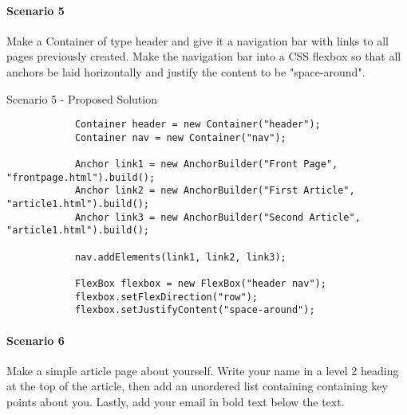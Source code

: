 \documentclass[12pt]{article}
\begin{document}
        \paragraph{Scenario 5}
        Make a Container of type header and give it a navigation bar with links to all pages previously created. Make the navigation bar into a CSS flexbox so that all anchors be laid horizontally and justify the content to be "space-around".
        
        \begin{shaded}
            Scenario 5 - Proposed Solution
            \begin{lstlisting}
            Container header = new Container("header");
            Container nav = new Container("nav");

            Anchor link1 = new AnchorBuilder("Front Page", "frontpage.html").build();
            Anchor link2 = new AnchorBuilder("First Article", "article1.html").build();
            Anchor link3 = new AnchorBuilder("Second Article", "article1.html").build();

            nav.addElements(link1, link2, link3);

            FlexBox flexbox = new FlexBox("header nav");
            flexbox.setFlexDirection("row");
            flexbox.setJustifyContent("space-around");
            \end{lstlisting}
        \end{shaded}

        \paragraph{Scenario 6}
        Make a simple article page about yourself. Write your name in a level 2 heading at the top of the article, then add an unordered list containing containing key points about you. Lastly, add your email in bold text below the text.
\end{document}
